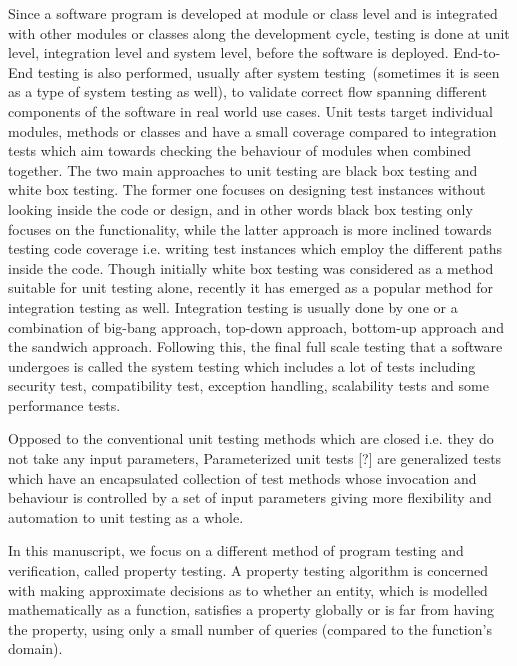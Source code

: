 Since a software program is developed at module or class level and is integrated with other modules or classes along the development cycle, testing is done at unit level, integration level and system level, before the software is deployed. End-to-End testing is also performed, usually after system testing~(sometimes it is seen as a type of system testing as well), to validate correct flow spanning different components of the software in real world use cases. Unit tests target individual modules, methods or classes and have a small coverage compared to integration tests which aim towards checking the behaviour of modules when combined together. The two main approaches to unit testing are black box testing and white box testing. The former one focuses on designing test instances without looking inside the code or design, and in other words black box testing only focuses on the functionality, while the latter approach is more inclined towards testing code coverage i.e. writing test instances which employ the different paths inside the code. Though initially white box testing was considered as a method suitable for unit testing alone, recently it has emerged as a popular method for integration testing as well. Integration testing is usually done by one or a combination of big-bang approach, top-down approach, bottom-up approach and the sandwich approach. Following this, the final full scale testing that a software undergoes is called the system testing which includes a lot of tests including security test, compatibility test, exception handling, scalability tests and some performance tests. 

Opposed to the conventional unit testing methods which are closed i.e. they do not take any input parameters, Parameterized unit tests [?]  %
are generalized tests which have an encapsulated collection of test methods whose invocation and behaviour is controlled by a set of input parameters giving more flexibility and automation to unit testing as a whole. 

In this manuscript, we focus on a different method of program testing and verification, called property testing. A property testing algorithm is concerned with making approximate decisions as to whether an entity, which is modelled mathematically as a function, satisfies a property globally or is far from having the property, using only a small number of queries (compared to the function's domain).
